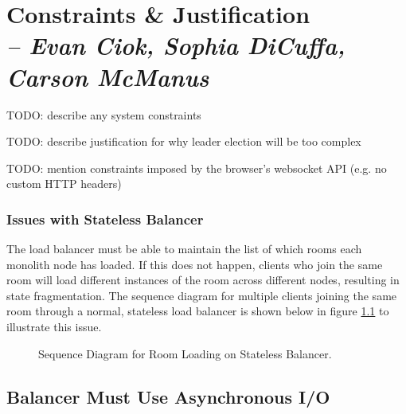 \chapter{Constraints \& Justification \\
  \small{\textit{-- Evan Ciok, Sophia DiCuffa, Carson McManus}}
  \label{Chapter::ConstraintsJustification}}


TODO: describe any system constraints

TODO: describe justification for why leader election will be too complex

TODO: mention constraints imposed by the browser's websocket API (e.g. no custom HTTP headers)

\subsection{Issues with Stateless Balancer}

The load balancer must be able to maintain the list of which rooms each monolith node has loaded. If this does not happen, clients who join the same room will load different instances of the room across different nodes, resulting in state fragmentation. The sequence diagram for multiple clients joining the same room through a normal, stateless load balancer is shown below in figure \ref{Figure::join-room-stateless} to illustrate this issue.

\begin{figure}[!htb]
  \centering
  \caption{\label{Figure::join-room-stateless} Sequence Diagram for Room Loading on Stateless Balancer.}
\end{figure}


\section{Balancer Must Use Asynchronous I/O   }

